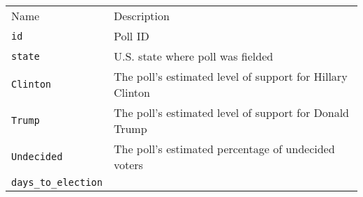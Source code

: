 \documentclass[]{article}
\begin{document}
\begin{longtable}[c]{@{}ll@{}}
\toprule\addlinespace
\begin{minipage}[b]{0.24\columnwidth}\raggedright
Name
\end{minipage} & \begin{minipage}[b]{0.70\columnwidth}\raggedright
Description
\end{minipage}
\\\addlinespace
\midrule\endhead
\begin{minipage}[t]{0.24\columnwidth}\raggedright
\texttt{id}
\end{minipage} & \begin{minipage}[t]{0.70\columnwidth}\raggedright
Poll ID
\end{minipage}
\\\addlinespace
\begin{minipage}[t]{0.24\columnwidth}\raggedright
\texttt{state}
\end{minipage} & \begin{minipage}[t]{0.70\columnwidth}\raggedright
U.S. state where poll was fielded
\end{minipage}
\\\addlinespace
\begin{minipage}[t]{0.24\columnwidth}\raggedright
\texttt{Clinton}
\end{minipage} & \begin{minipage}[t]{0.70\columnwidth}\raggedright
The poll's estimated level of support for Hillary Clinton
\end{minipage}
\\\addlinespace
\begin{minipage}[t]{0.24\columnwidth}\raggedright
\texttt{Trump}
\end{minipage} & \begin{minipage}[t]{0.70\columnwidth}\raggedright
The poll's estimated level of support for Donald Trump
\end{minipage}
\\\addlinespace
\begin{minipage}[t]{0.24\columnwidth}\raggedright
\texttt{Undecided}
\end{minipage} & \begin{minipage}[t]{0.70\columnwidth}\raggedright
The poll's estimated percentage of undecided voters
\end{minipage}
\\\addlinespace
\begin{minipage}[t]{0.24\columnwidth}\raggedright
\texttt{days\_to\_election}

\end{minipage}
\end{longtable}
\end{document}
